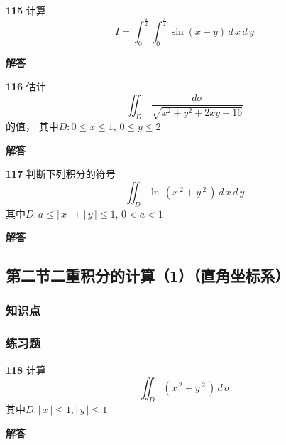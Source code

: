 \documentclass[a4paper,10pt]{article} %
\begin{document}


\textheight


\par\noindent \textbf{115} \quad 计算
$$ I=\int_0^{\frac{\pi}{2}}\int_0^{\frac{\pi}{2}}\sin(x+y)\,d\,x\,d\,y$$
\par\noindent \textbf{ 解答}





\textheight


\par\noindent \textbf{116} \quad 估计
$$ \iint_D\,\frac{d\sigma}{\sqrt{x^2+y^2+2xy+16}}$$
的值， 其中$D: 0\leq x\leq 1$, $0\leq y\leq 2$
\par\noindent \textbf{ 解答}





\textheight


\par\noindent \textbf{117} \quad 判断下列积分的符号
$$ \iint_D \ln \,\left(x\,^2+y\,^2\,\right)\,d\,x\,d\,y$$
其中$D: a\leq |\,x\,|+|\,y\,|\leq 1$, $0<a<1$
\par\noindent \textbf{ 解答}





\textheight


\newpage
\subsection{第二节\quad 二重积分的计算（1）（直角坐标系）}
\subsubsection{知识点}
\subsubsection{练习题}
\par\noindent \textbf{118} \quad 计算
$$ \iint_D \left(x\,^2+y\,^2\,\right)\,d\,\sigma$$
其中$D: |\,x\,|\leq 1, |\,y\,|\leq 1$
\par\noindent \textbf{ 解答}
\end{document}
